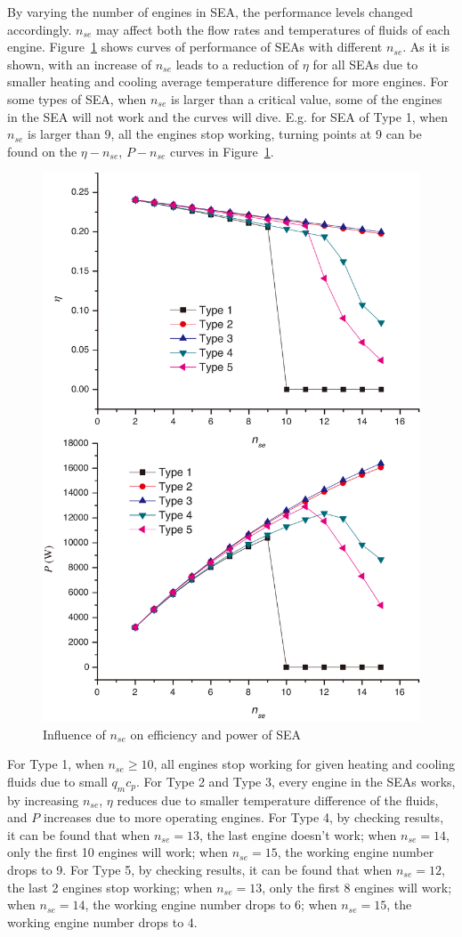 \documentclass[review,3p,10t]{elsarticle}
\begin{document}
By varying the number of engines in SEA, the performance levels changed accordingly. $n_{se}$ may affect both the flow rates and temperatures of fluids of each engine. Figure~\ref{fig:n_se} shows curves of performance of SEAs with different $n_{se}$. As it is shown, with an increase of $n_{se}$ leads to a reduction of $\eta$ for all SEAs due to smaller heating and cooling average temperature difference for more engines. For some types of SEA, when $n_{se}$ is larger than a critical value, some of the engines in the SEA will not work and the curves will dive. E.g. for SEA of Type 1, when $n_{se}$ is larger than 9, all the engines stop working, turning points at 9 can be found on the $\eta-n_{se}$, $P-n_{se}$ curves in Figure~\ref{fig:n_se}.

\noindent \begin{figure}[htbp]
\begin{center}
	\includegraphics[width = 0.7\columnwidth]{./graphics/n_se}
	\caption{Influence of $n_{se}$ on efficiency and power of SEA}
	\label{fig:n_se}
\end{center}
\end{figure}

For Type 1, when $n_{se} \geqslant 10$, all engines stop working for given heating and cooling fluids due to small $q_mc_p$. For Type 2 and Type 3, every engine in the SEAs works, by increasing $n_{se}$, $\eta$ reduces due to smaller temperature difference of the fluids, and $P$ increases due to more operating engines. For Type 4, by checking results, it can be found that when $n_{se} = 13$,  the last engine doesn't work; when $n_{se} = 14$, only the first 10 engines will work; when $n_{se} = 15$, the working engine number drops to 9. For Type 5, by checking results, it can be found that when $n_{se} = 12$, the last 2 engines stop working; when $n_{se} = 13$, only the first 8 engines will work; when $n_{se} = 14$, the working engine number drops to 6; when $n_{se} = 15$, the working engine number drops to 4.
\end{document}
